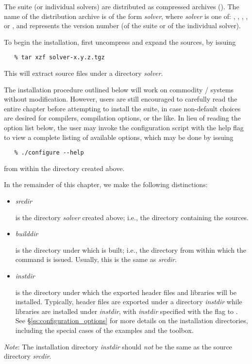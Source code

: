 The {\sundials} suite (or individual solvers) are distributed as compressed archives
(). The name of the distribution archive is of the form {\em solver},
where {\em solver} is one of: , , , , or ,
and  represents the version number (of the {\sundials} suite or of the individual solver).

To begin the installation, first uncompress and expand the sources, by issuing
\begin{verbatim}
   % tar xzf solver-x.y.z.tgz
\end{verbatim}
This will extract source files under a directory {\em solver}.

The installation procedure outlined below will work on commodity {\linux}/{\unix} 
systems without modification. However, users are still encouraged to carefully read 
the entire chapter before attempting to install the {\sundials} suite, in case
non-default choices are desired for compilers, compilation options, or the like.
In lieu of reading the option list below, the user may invoke the configuration
script with the help flag to view a complete listing of available options, which
may be done by issuing 
\begin{verbatim}
   % ./configure --help 
\end{verbatim}
from within the directory created above.

In the remainder of this chapter, we make the following distinctions:
\begin{itemize}

\item {\em srcdir} 

  is the directory {\em solver} created above; i.e., the 
  directory containing the {\sundials} sources.

\item {\em builddir}

  is the directory under which {\sundials} is built; i.e., the directory
  from within which the  command is issued. Usually, this is the same as
  {\em srcdir}.

\item {\em instdir}

  is the directory under which the {\sundials} exported header files
  and libraries will be installed. Typically, header files are exported under a directory
  {\em instdir} while libraries are installed under {\em instdir},
  with {\em instdir} specified with the  flag to . 
  See \S\ref{ss:configuration_options} for more details on the installation directories, 
  including the special cases of the {\sundials} examples and the {\sundialsTB} toolbox.

\end{itemize}
{\noindent}{\warn}{\em Note}: The installation directory {\em instdir} should {\em not} be the same as
the source directory {\em srcdir}.

